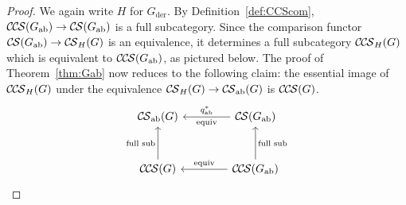 \documentclass[10pt]{amsart}
\theoremstyle{plain}
\theoremstyle{definition}
\newcommand{\der}{_{\operatorname{der}}}
\newcommand{\ab}{_{\operatorname{ab}}}
\newcommand{\CS}{{\mathcal{C\hskip-0.8pt S}}}
\newcommand{\CCS}{{\mathcal{C\hskip-.8pt C\hskip-0.8pt S}}}
\newcommand{\CSab}{\CS_{\operatorname{ab}}}
\begin{document}
\begin{proof}
We again write $H$ for $G\der$.
By Definition~\ref{def:CCScom}, $\CCS(G\ab) \to \CS(G\ab)$ is a full subcategory.
Since the comparison functor $\CS(G\ab) \to \CS_{H}(G)$ is an equivalence, it determines a full subcategory $\CCS_{H}(G)$ which is equivalent to $\CCS(G\ab)$, as pictured below.
The proof of Theorem~\ref{thm:Gab} now reduces to the following claim: the essential image of $\CCS_H(G)$ under the equivalence $\CS_{H}(G) \to \CSab(G)$ is $\CCS(G)$.
\[
\begin{tikzcd}[row sep=30, column sep=40]
\CSab(G) & \CS(G\ab) \arrow{l}{\text{equiv}}[swap]{q\ab^*} \\
\CCS(G) \arrow{u}{\text{full sub}} & \CCS(G\ab) \arrow{u}[swap]{\text{full sub}} \arrow{l}[swap]{\text{equiv}}
\end{tikzcd}
\]


\end{proof}
\end{document}
